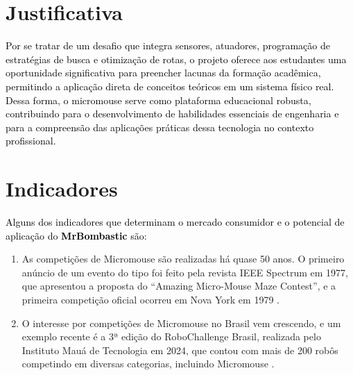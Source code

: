 \section{Justificativa}

\textcolor{black}{
Por se tratar de um desafio que integra sensores, atuadores, programação de estratégias de busca e otimização de rotas, o projeto oferece aos estudantes uma oportunidade significativa para preencher lacunas da formação acadêmica, permitindo a aplicação direta de conceitos teóricos em um sistema físico real. Dessa forma, o micromouse serve como plataforma educacional robusta, contribuindo para o desenvolvimento de habilidades essenciais de engenharia e para a compreensão das aplicações práticas dessa tecnologia no contexto profissional.
}

\section{Indicadores}
\textcolor{black}{Alguns dos indicadores que determinam o mercado consumidor e o potencial de aplicação do \textbf{MrBombastic} são:}
\begin{enumerate}
    \item As competições de Micromouse são realizadas há quase 50 anos. O primeiro anúncio de um evento do tipo foi feito pela revista IEEE Spectrum em 1977, que apresentou a proposta do “Amazing Micro-Mouse Maze Contest”, e a primeira competição oficial ocorreu em Nova York em 1979 \cite{christiansen1977}.
    \item O interesse por competições de Micromouse no Brasil vem crescendo, e um exemplo recente é a 3ª edição do RoboChallenge Brasil, realizada pelo Instituto Mauá de Tecnologia em 2024, que contou com mais de 200 robôs competindo em diversas categorias, incluindo Micromouse \cite{maua_robochallenge_2024}.
\end{enumerate}



